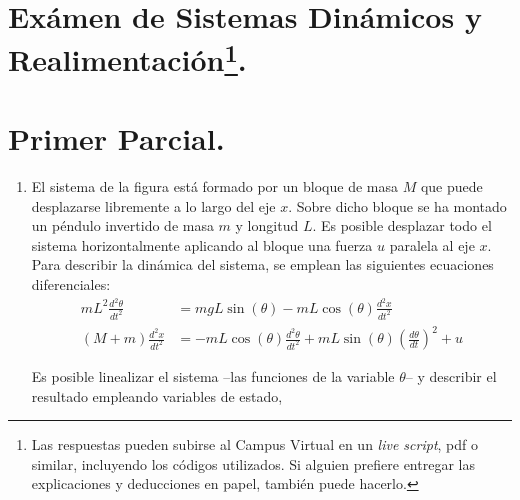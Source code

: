 \documentclass[10pt,a4paper]{article}
\begin{document}
\thispagestyle{fancy}

\section*{Exámen de Sistemas Dinámicos y Realimentación\footnote{Las respuestas pueden subirse al Campus Virtual en un \emph{live script}, pdf o similar, incluyendo los códigos utilizados. Si alguien prefiere entregar las explicaciones y deducciones en papel, también puede hacerlo.}.}

\section{Primer Parcial.}
\begin{enumerate}
\item El sistema de la figura está formado por un bloque de masa $M$ que puede desplazarse libremente a lo largo del eje $x$. Sobre dicho bloque se ha montado un péndulo invertido de masa $m$ y longitud $L$. Es posible  desplazar todo el sistema horizontalmente aplicando al bloque una fuerza $u$ paralela al eje $x$. Para describir la dinámica del sistema, se emplean las siguientes ecuaciones diferenciales:
\begin{align}
mL^2\frac{d^2\theta}{dt^2} &= mgL\sin(\theta) - mL\cos(\theta)\frac{d^2 x}{dt^2} \label{eq1}\\
(M+m)\frac{d^2x}{dt^2} &= -mL\cos(\theta)\frac{d^2\theta}{dt^2} + mL\sin(\theta)\left(\frac{d\theta}{dt} \right)^2 + u \label{eq2}
\end{align} 

Es posible linealizar el sistema --las funciones de la variable $\theta$-- y describir el resultado empleando variables de estado,


\end{enumerate}
\end{document}
